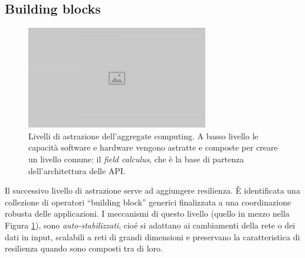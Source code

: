 \subsection{Building blocks}
\begin{figure}
  \centering
  \includegraphics[width=\linewidth]{media/placeholder.jpg}
  \caption{Livelli di astrazione dell'aggregate computing. A basso livello le
    capacità software e hardware vengono astratte e composte per creare un
    livello comune: il \textit{field calculus}, che è la base di
    partenza dell'architettura delle API.}
  \label{fig:abstraction-layers}
\end{figure}


Il successivo livello di astrazione serve ad aggiungere resilienza. È
identificata una collezione di operatori ``building block'' generici finalizzata
a una coordinazione robusta delle applicazioni. I meccanismi di questo livello
(quello in mezzo nella Figura \ref{fig:abstraction-layers}), sono
\textit{auto-stabilizzati}, cioé si adattano ai cambiamenti della rete o dei
dati in input, scalabili a reti di grandi dimensioni e preservano la
caratteristica di resilienza quando sono composti tra di loro\cite{7056345}.

